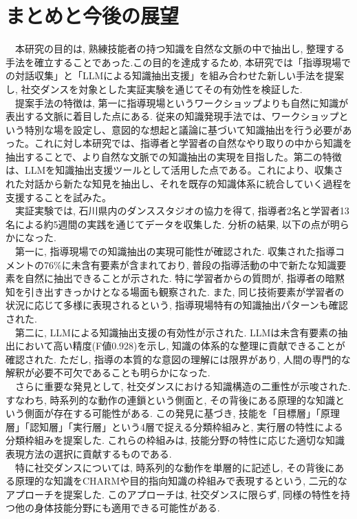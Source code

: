 \chapter{まとめと今後の展望}
　本研究の目的は, 熟練技能者の持つ知識を自然な文脈の中で抽出し, 整理する手法を確立することであった.この目的を達成するため, 本研究では「指導現場での対話収集」と「LLMによる知識抽出支援」を組み合わせた新しい手法を提案し, 社交ダンスを対象とした実証実験を通じてその有効性を検証した.\\
　提案手法の特徴は, 第一に指導現場というワークショップよりも自然に知識が表出する文脈に着目した点にある. 従来の知識発現手法では、ワークショップという特別な場を設定し、意図的な想起と議論に基づいて知識抽出を行う必要があった。これに対し本研究では、指導者と学習者の自然なやり取りの中から知識を抽出することで、より自然な文脈での知識抽出の実現を目指した。第二の特徴は、LLMを知識抽出支援ツールとして活用した点である。これにより、収集された対話から新たな知見を抽出し、それを既存の知識体系に統合していく過程を支援することを試みた。\\
　実証実験では, 石川県内のダンススタジオの協力を得て, 指導者2名と学習者13名による約5週間の実践を通じてデータを収集した. 分析の結果, 以下の点が明らかになった.\\
　第一に, 指導現場での知識抽出の実現可能性が確認された. 収集された指導コメントの76\%に未含有要素が含まれており, 普段の指導活動の中で新たな知識要素を自然に抽出できることが示された. 特に学習者からの質問が, 指導者の暗黙知を引き出すきっかけとなる場面も観察された. また, 同じ技術要素が学習者の状況に応じて多様に表現されるという, 指導現場特有の知識抽出パターンも確認された.\\
　第二に, LLMによる知識抽出支援の有効性が示された. LLMは未含有要素の抽出において高い精度(F値0.928)を示し, 知識の体系的な整理に貢献できることが確認された. ただし, 指導の本質的な意図の理解には限界があり, 人間の専門的な解釈が必要不可欠であることも明らかになった.\\
　さらに重要な発見として, 社交ダンスにおける知識構造の二重性が示唆された. すなわち, 時系列的な動作の連鎖という側面と, その背後にある原理的な知識という側面が存在する可能性がある. この発見に基づき, 技能を「目標層」「原理層」「認知層」「実行層」という4層で捉える分類枠組みと, 実行層の特性による分類枠組みを提案した. これらの枠組みは, 技能分野の特性に応じた適切な知識表現方法の選択に貢献するものである.\\
　特に社交ダンスについては, 時系列的な動作を単層的に記述し, その背後にある原理的な知識をCHARMや目的指向知識の枠組みで表現するという, 二元的なアプローチを提案した. このアプローチは, 社交ダンスに限らず, 同様の特性を持つ他の身体技能分野にも適用できる可能性がある.\\
